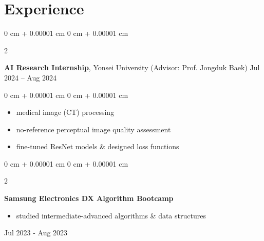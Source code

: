 \documentclass[10pt, letterpaper]{article}
\newenvironment{highlights}{
    \begin{itemize}[
        topsep=0.10 cm,
        parsep=0.10 cm,
        partopsep=0pt,
        itemsep=0pt,
        leftmargin=0 cm + 10pt
    ]
}{
    \end{itemize}
} %
\newenvironment{onecolentry}{
    \begin{adjustwidth}{
        0 cm + 0.00001 cm
    }{
        0 cm + 0.00001 cm
    }
}{
    \end{adjustwidth}
} %
\newenvironment{twocolentry}[2][]{
    \onecolentry
    \def\secondColumn{#2}
    \setcolumnwidth{\fill, 4.5 cm}
    \begin{paracol}{2}
}{
    \switchcolumn \raggedleft \secondColumn
    \end{paracol}
    \endonecolentry
} %
\begin{document}
    \section{Experience}
        \begin{twocolentry}{
            Jul 2024 – Aug 2024
        }
            \textbf{AI Research Internship}, Yonsei University (Advisor: Prof. Jongduk Baek)\end{twocolentry}
        \vspace{0.10 cm}
        \begin{onecolentry}
            \begin{highlights}
                \item medical image (CT) processing
                \item no-reference perceptual image quality assessment
                \item fine-tuned ResNet models \& designed loss functions
            \end{highlights}
        \end{onecolentry}
        \vspace{0.2 cm}
        \begin{twocolentry}{
            Jul 2023 - Aug 2023
        }
            \textbf{Samsung Electronics DX Algorithm Bootcamp}
            \begin{highlights}
                \item studied intermediate-advanced algorithms \& data structures
            \end{highlights}
        \end{twocolentry}
\end{document}
